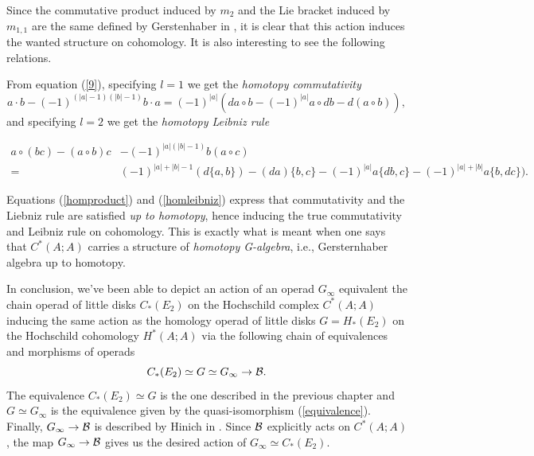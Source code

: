 \documentclass[TFM.tex]{subfiles}
\begin{document}
Since the commutative product induced by $m_2$ and the Lie bracket induced by $m_{1,1}$ are the same defined by Gerstenhaber in \cite{Gerstenhaber}, it is clear that this action induces the wanted structure on cohomology. It is also interesting to see the following relations.

From equation (\ref{9}), specifying $l=1$ we get the \emph{homotopy commutativity}
\begin{equation}\label{homproduct}
a\cdot b-(-1)^{(|a|-1)(|b|-1)}b\cdot a=(-1)^{|a|}(da\circ b-(-1)^{|a|}a\circ db-d(a\circ b)),
\end{equation}
and specifying $l=2$ we get the \emph{homotopy Leibniz rule}

\begin{align}\label{homleibniz}
a\circ (bc)-(a\circ b)c&-(-1)^{|a|(|b|-1)}b(a\circ c)\\
=&(-1)^{|a|+|b|-1}(d\{a,b\})-(da)\{b,c\}-(-1)^{|a|}a\{db,c\}-(-1)^{|a|+|b|}a\{b,dc\})\nonumber.
\end{align}

Equations (\ref{homproduct}) and (\ref{homleibniz}) express that commutativity and the Liebniz rule are satisfied \emph{up to homotopy}, hence inducing the  true commutativity and Leibniz rule on cohomology. This is exactly what is meant when one says that $C^*(A;A)$ carries a structure of \emph{homotopy G-algebra}, i.e., Gersternhaber algebra up to homotopy. 

In conclusion, we've been able to depict an action of an operad $G_\infty$ equivalent the chain operad of little disks $C_*(E_2)$ on the Hochschild complex $C^*(A;A)$ inducing the same action as the homology operad of little disks $G=H_*(E_2)$ on the Hochschild cohomology $H^*(A;A)$ via the following chain of equivalences and morphisms of operads
\[
C_*(E_2)\simeq G \simeq G_\infty \to \mathcal{B}.
\]
The equivalence $C_*(E_2)\simeq G$ is the one described in the previous chapter and $G \simeq G_\infty$ is the equivalence given by the quasi-isomorphism (\ref{equivalence}). Finally, $G_\infty\to\mathcal{B}$ is described by Hinich in \cite{Hinich}. Since $\mathcal{B}$ explicitly acts on $C^*(A;A)$, the map $G_\infty\to\mathcal{B}$ gives us the desired action of $G_\infty\simeq C_*(E_2)$.
\end{document}

